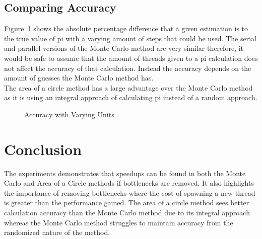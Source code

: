\documentclass[conference]{IEEEtran}
\begin{document}
\subsection{Comparing Accuracy}
Figure~\ref{fig:accuracy} shows the absolute percentage difference that a given estimation is to the true value of pi with a varying amount of steps that could be used.
The serial and parallel versions of the Monte Carlo method are very similar therefore, it would be safe to assume that the amount of threads given to a pi calculation does not affect the accuracy of that calculation. 
Instead the accuracy depends on the amount of guesses the Monte Carlo method has.  \\
The area of a circle method has a large advantage over the Monte Carlo method as it is using an integral approach of calculating pi instead of a random approach.

\begin{figure}[H]
    \centering
    \caption{Accuracy with Varying Units}
    \label{fig:accuracy}
\end{figure}

\section{Conclusion}
The experiments demonstrates that speedups can be found in both the Monte Carlo and Area of a Circle methods if bottlenecks are removed.
It also highlights the importance of removing bottlenecks where the cost of spawning a new thread is greater than the performance gained.
The area of a circle method sees better calculation accuracy than the Monte Carlo method due to its integral approach whereas the Monte Carlo method struggles to maintain accuracy from the randomized nature of the method.
\end{document}
